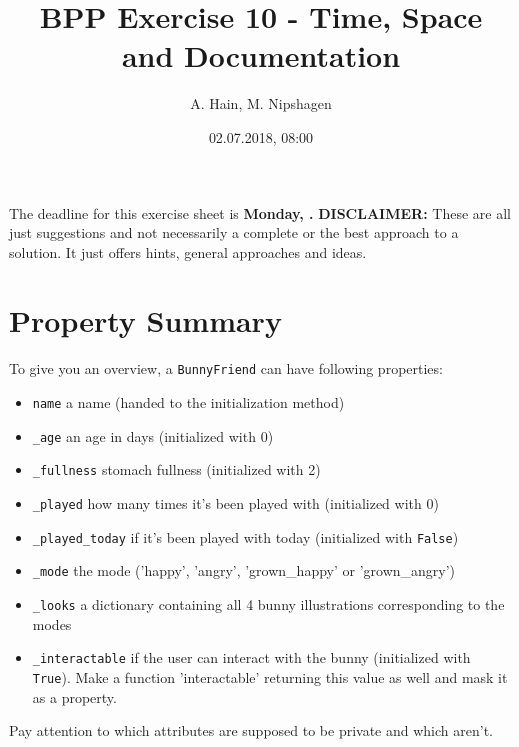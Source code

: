 

\title{BPP Exercise 10 - Time, Space and Documentation}
\author{A. Hain, M. Nipshagen}
\date{02.07.2018, 08:00}

\makeatletter
\let\thetitle\@title
\let\theauthor\@author
\let\thedate\@date
\makeatother

\newcommand\itemsub[1]{
	\begin{itemize}
		\item #1
	\end{itemize}
}

\setcounter{secnumdepth}{0}


The deadline for this exercise sheet is \textbf{Monday, \thedate.}
\tableofcontents
\vspace{12pt}\noindent
\textbf{DISCLAIMER:} These are all just suggestions and not necessarily a complete
or the best approach to a solution. It just offers hints, general approaches
and ideas.
\pagebreak

\section{Property Summary}
\noindent To give you an overview, a \texttt{BunnyFriend} can have following properties:
\begin{itemize}
	\item \texttt{name} a name (handed to the initialization method)
	\item \texttt{\_age} an age in days (initialized with 0)
	\item \texttt{\_fullness} stomach fullness (initialized with 2)
	\item \texttt{\_played} how many times it's been played with (initialized with 0)
	\item \texttt{\_played\_today} if it's been played with today (initialized with \texttt{False})
	\item \texttt{\_mode} the mode ('happy', 'angry', 'grown\_happy' or 'grown\_angry')
	\item \texttt{\_looks} a dictionary containing all 4 bunny illustrations corresponding to the modes
	\item \texttt{\_interactable} if the user can interact with the bunny (initialized with \texttt{True}).
	Make a function 'interactable' returning this value as well and mask it as a property.
\end{itemize}
Pay attention to which attributes are supposed to be private and which aren't.

\pagebreak

